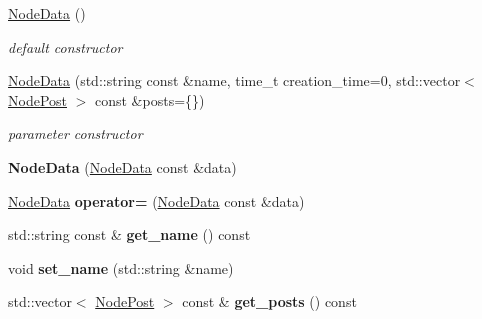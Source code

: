 \begin{DoxyCompactItemize}
\item 
\hypertarget{classfb_1_1_node_data_af784d2cb623aef4b31514fbe37512a5d}{\hyperlink{classfb_1_1_node_data_af784d2cb623aef4b31514fbe37512a5d}{Node\+Data} ()}\label{classfb_1_1_node_data_af784d2cb623aef4b31514fbe37512a5d}

\begin{DoxyCompactList}\small\item\em default constructor \end{DoxyCompactList}\item 
\hyperlink{classfb_1_1_node_data_abe279b5d0d097b73124eba83b9ce0cab}{Node\+Data} (std\+::string const \&name, time\+\_\+t creation\+\_\+time=0, std\+::vector$<$ \hyperlink{structfb_1_1_node_post}{Node\+Post} $>$ const \&posts=\{\})
\begin{DoxyCompactList}\small\item\em parameter constructor \end{DoxyCompactList}\item 
\hypertarget{classfb_1_1_node_data_a1be4427899ef4cc2a5357c0526f5801b}{{\bfseries Node\+Data} (\hyperlink{classfb_1_1_node_data}{Node\+Data} const \&data)}\label{classfb_1_1_node_data_a1be4427899ef4cc2a5357c0526f5801b}

\item 
\hypertarget{classfb_1_1_node_data_a0538dae88274b127d1047670bd11a8ce}{\hyperlink{classfb_1_1_node_data}{Node\+Data} {\bfseries operator=} (\hyperlink{classfb_1_1_node_data}{Node\+Data} const \&data)}\label{classfb_1_1_node_data_a0538dae88274b127d1047670bd11a8ce}

\item 
\hypertarget{classfb_1_1_node_data_a4377f6518c8bbd10257dd2bf586d19c2}{std\+::string const \& {\bfseries get\+\_\+name} () const }\label{classfb_1_1_node_data_a4377f6518c8bbd10257dd2bf586d19c2}

\item 
\hypertarget{classfb_1_1_node_data_ab27858fd3d554fc73cf579485e4a6794}{void {\bfseries set\+\_\+name} (std\+::string \&name)}\label{classfb_1_1_node_data_ab27858fd3d554fc73cf579485e4a6794}

\item 
\hypertarget{classfb_1_1_node_data_a3b2687e4867f4c649d9774cf9f41cea1}{std\+::vector$<$ \hyperlink{structfb_1_1_node_post}{Node\+Post} $>$ const \& {\bfseries get\+\_\+posts} () const }\label{classfb_1_1_node_data_a3b2687e4867f4c649d9774cf9f41cea1}


\end{DoxyCompactItemize}
